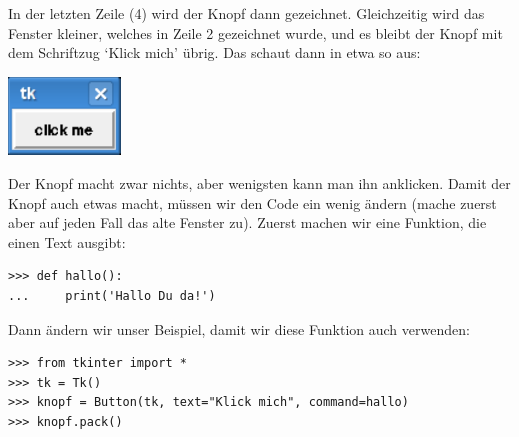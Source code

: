 \par

In der letzten Zeile (4) wird der Knopf dann gezeichnet. Gleichzeitig wird das Fenster kleiner, welches in Zeile 2 gezeichnet wurde, und es bleibt der Knopf mit dem Schriftzug `Klick mich' übrig. Das schaut dann in etwa so aus:

\begin{center}
\includegraphics*[width=30mm]{images/figure31}
\end{center}

Der Knopf macht zwar nichts, aber wenigsten kann man ihn anklicken. Damit der Knopf auch etwas macht, müssen wir den Code ein wenig ändern (mache zuerst aber auf jeden Fall das alte Fenster zu). Zuerst machen wir eine Funktion, die einen Text ausgibt:

\begin{Verbatim}[frame=single]
>>> def hallo():
...     print('Hallo Du da!')
\end{Verbatim}

\noindent
Dann ändern wir unser Beispiel, damit wir diese Funktion auch verwenden:

\begin{Verbatim}[frame=single]
>>> from tkinter import *
>>> tk = Tk()
>>> knopf = Button(tk, text="Klick mich", command=hallo)
>>> knopf.pack()
\end{Verbatim}

